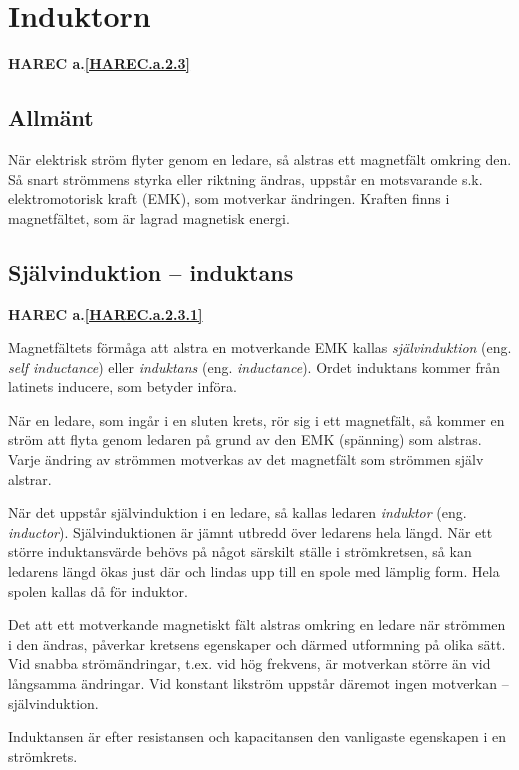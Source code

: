 \section{Induktorn}
\textbf{HAREC a.\ref{HAREC.a.2.3}\label{myHAREC.a.2.3}}

\subsection{Allmänt}

När elektrisk ström flyter genom en ledare, så alstras ett magnetfält omkring
den. Så snart strömmens styrka eller riktning ändras, uppstår en motsvarande
s.k. elektromotorisk kraft (EMK), som motverkar ändringen. Kraften finns i
magnetfältet, som är lagrad magnetisk energi.


\subsection{Självinduktion -- induktans}
\textbf{HAREC a.\ref{HAREC.a.2.3.1}\label{myHAREC.a.2.3.1}}

Magnetfältets förmåga att alstra en motverkande EMK kallas
\emph{självinduktion} (eng. \emph{self inductance}) eller
\emph{induktans} (eng. \emph{inductance}).
Ordet induktans kommer från latinets inducere, som betyder införa.

När en ledare, som ingår i en sluten krets, rör sig i ett magnetfält, så kommer
en ström att flyta genom ledaren på grund av den EMK (spänning) som alstras.
Varje ändring av strömmen motverkas av det magnetfält som strömmen själv
alstrar.

När det uppstår självinduktion i en ledare, så kallas ledaren \emph{induktor}
(eng. \emph{inductor}).
Självinduktionen är jämnt utbredd över ledarens hela längd. När ett större
induktansvärde behövs på något särskilt ställe i strömkretsen, så kan ledarens
längd ökas just där och lindas upp till en spole med lämplig form.
Hela spolen kallas då för induktor.

Det att ett motverkande magnetiskt fält alstras omkring en ledare när strömmen i
den ändras, påverkar kretsens egenskaper och därmed utformning på olika sätt.
Vid snabba strömändringar, t.ex. vid hög frekvens, är motverkan större än vid
långsamma ändringar.
Vid konstant likström uppstår däremot ingen motverkan -- självinduktion.

Induktansen är efter resistansen och kapacitansen den vanligaste egenskapen i
en strömkrets.

